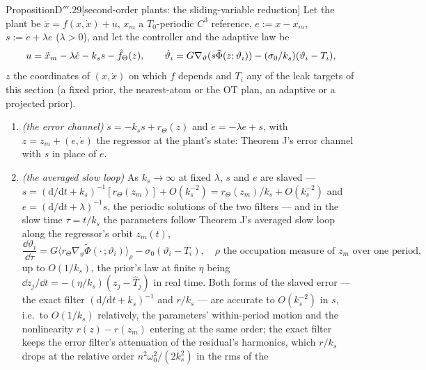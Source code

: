\begin{thm}{Proposition}{D$'''$.29}[second-order plants: the sliding-variable
reduction]\label{res:thmDppp:29}%
Let the plant be $\ddot x = f(x,\dot x) + u$, $x_m$ a $T_0$-periodic $C^3$ reference, $e := x - x_m$,
$s := \dot e + \lambda e$ ($\lambda > 0$), and let the controller and the adaptive law be
\[
  u = \ddot x_m - \lambda\dot e - k_s s - \hat f_\Theta(z),\qquad
  \dot\vartheta_i = G\nabla_\vartheta(s\tilde\Phi(z;\vartheta_i)) - (\sigma_0/k_s)(\vartheta_i - T_i),
\]
$z$ the coordinates of $(x,\dot x)$ on which $f$ depends and $T_i$ any of the leak targets of this section (a fixed
prior, the nearest-atom or the OT plan, an adaptive or a projected prior).
\begin{enumerate}[label=\textup{(\roman*)}]
  \item \emph{(the error channel)} $\dot s = -k_s s + r_\Theta(z)$ and $\dot e = -\lambda e + s$, with
    $z = z_m + (e,\dot e)$ the regressor at the plant's state: Theorem J's error channel with $s$ in place of $e$.
  \item \emph{(the averaged slow loop)} As $k_s\to\infty$ at fixed $\lambda$, $s$ and $e$ are slaved ---
    $s = (\mathrm{d}/\mathrm{d}t + k_s)^{-1}[r_\Theta(z_m)] + O(k_s^{-2}) = r_\Theta(z_m)/k_s + O(k_s^{-2})$ and
    $e = (\mathrm{d}/\mathrm{d}t + \lambda)^{-1}s$, the periodic solutions of the two filters --- and in the slow time
    $\tau = t/k_s$ the parameters follow Theorem J's averaged slow loop along the regressor's orbit $z_m(t)$,
    \[
      \frac{\dd\vartheta_i}{\dd\tau} = G\langle r_\Theta\nabla_\vartheta\tilde\Phi(\cdot\,;\vartheta_i)\rangle_\rho
      - \sigma_0(\vartheta_i - T_i),\quad\text{$\rho$ the occupation measure of $z_m$ over one period,}
    \]
    up to $O(1/k_s)$, the prior's law at finite $\eta$ being $\dd z_j/\dd t = -(\eta/k_s)(z_j - \hat T_j)$ in real
    time. Both forms of the slaved error --- the exact filter $(\mathrm{d}/\mathrm{d}t + k_s)^{-1}$ and $r/k_s$ ---
    are accurate to $O(k_s^{-2})$ in $s$, i.e.\ to $O(1/k_s)$ relatively, the parameters' within-period motion and the
    nonlinearity $r(z) - r(z_m)$ entering at the same order; the exact filter keeps the error filter's attenuation of
    the residual's harmonics, which $r/k_s$ drops at the relative order $n^2\omega_0^2/(2k_s^2)$ in the rms of the

\end{enumerate}
\end{thm}
